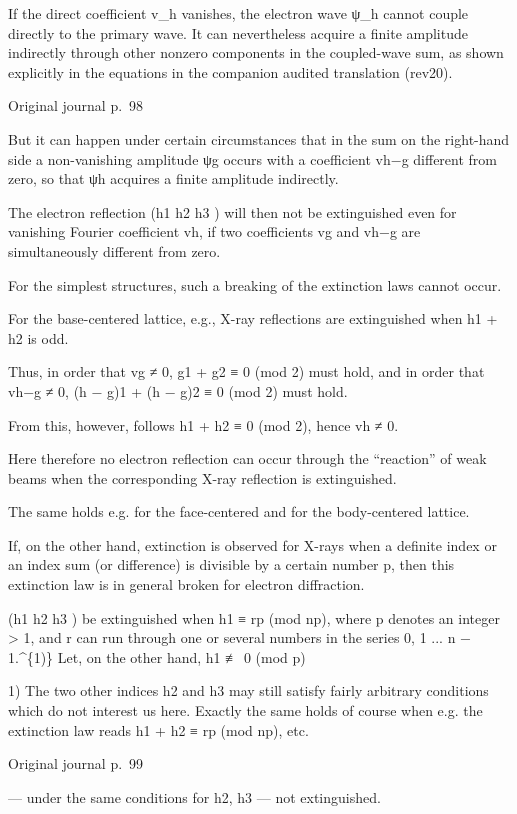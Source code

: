 \documentclass[10pt]{article}
\newcommand{\origpage}[1]{\par\medskip\noindent\hfill{\small\color{notegray}Original journal p.~#1}\hfill\mbox{}\par\smallskip}
\begin{document}
If the direct coefficient v\_h vanishes, the electron wave ψ\_h cannot couple directly to the primary wave. It can nevertheless acquire a finite amplitude indirectly through other nonzero components in the coupled-wave sum, as shown explicitly in the equations in the companion audited translation (rev20).\par
\origpage{98}
But it can happen under certain circumstances that in the sum on the right-hand side a non-vanishing amplitude ψg occurs with a coefficient vh−g different from zero, so that ψh acquires a finite amplitude indirectly.\par
The electron reflection (h1 h2 h3 ) will then not be extinguished even for vanishing Fourier coefficient vh, if two coefficients vg and vh−g are simultaneously different from zero.\par
For the simplest structures, such a breaking of the extinction laws cannot occur.\par
For the base-centered lattice, e.g., X-ray reflections are extinguished when h1 + h2 is odd.\par
Thus, in order that vg ≠ 0, g1 + g2 ≡ 0 (mod 2) must hold, and in order that vh−g ≠ 0, (h − g)1 + (h − g)2 ≡ 0 (mod 2) must hold.\par
From this, however, follows h1 + h2 ≡ 0 (mod 2), hence vh ≠ 0.\par
Here therefore no electron reflection can occur through the “reaction” of weak beams when the corresponding X-ray reflection is extinguished.\par
The same holds e.g. for the face-centered and for the body-centered lattice.\par
If, on the other hand, extinction is observed for X-rays when a definite index or an index sum (or difference) is divisible by a certain number p, then this extinction law is in general broken for electron diffraction.\par
(h1 h2 h3 ) be extinguished when h1 ≡ rp (mod np), where p denotes an integer > 1, and r can run through one or several numbers in the series 0, 1 ... n − 1.\textasciicircum{}\{1)\} Let, on the other hand, h1 ≢ 0 (mod p)\par
\noindent\footnotesize 1) The two other indices h2 and h3 may still satisfy fairly arbitrary conditions which do not interest us here. Exactly the same holds of course when e.g. the extinction law reads h1 + h2 ≡ rp (mod np), etc.\par\normalsize
\origpage{99}
— under the same conditions for h2, h3 — not extinguished.\par
\end{document}
